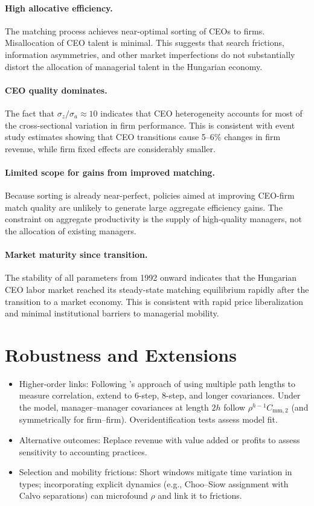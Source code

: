 \documentclass[11pt]{article}
\begin{document}
\paragraph{High allocative efficiency.} The matching process achieves near-optimal sorting of CEOs to firms. Misallocation of CEO talent is minimal. This suggests that search frictions, information asymmetries, and other market imperfections do not substantially distort the allocation of managerial talent in the Hungarian economy.

\paragraph{CEO quality dominates.} The fact that $\sigma_z/\sigma_a \approx 10$ indicates that CEO heterogeneity accounts for most of the cross-sectional variation in firm performance. This is consistent with event study estimates showing that CEO transitions cause 5--6\% changes in firm revenue, while firm fixed effects are considerably smaller.

\paragraph{Limited scope for gains from improved matching.} Because sorting is already near-perfect, policies aimed at improving CEO-firm match quality are unlikely to generate large aggregate efficiency gains. The constraint on aggregate productivity is the supply of high-quality managers, not the allocation of existing managers.

\paragraph{Market maturity since transition.} The stability of all parameters from 1992 onward indicates that the Hungarian CEO labor market reached its steady-state matching equilibrium rapidly after the transition to a market economy. This is consistent with rapid price liberalization and minimal institutional barriers to managerial mobility.

\section{Robustness and Extensions}
\begin{itemize}
  \item Higher-order links: Following \citet{Clark2023}'s approach of using multiple path lengths to measure correlation, extend to 6-step, 8-step, and longer covariances. Under the model, manager--manager covariances at length $2h$ follow $\rho^{h-1} C_{\text{mm},2}$ (and symmetrically for firm--firm). Overidentification tests assess model fit.
  \item Alternative outcomes: Replace revenue with value added or profits to assess sensitivity to accounting practices.
  \item Selection and mobility frictions: Short windows mitigate time variation in types; incorporating explicit dynamics (e.g., Choo--Siow assignment with Calvo separations) can microfound $\rho$ and link it to frictions.
\end{itemize}
\end{document}
